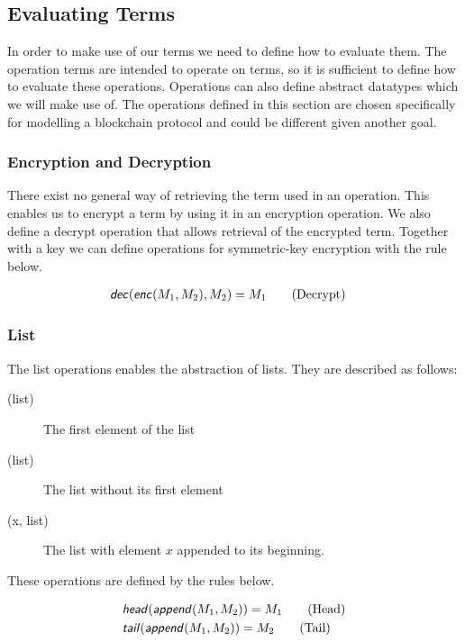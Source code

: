 \subsection{Evaluating Terms}
In order to make use of our terms we need to define how to evaluate them.
The operation terms are intended to operate on terms, so it is sufficient to define how to evaluate these operations.
Operations can also define abstract datatypes which we will make use of.
The operations defined in this section are chosen specifically for modelling a blockchain protocol and could be different given another goal.



\subsubsection{Encryption and Decryption}
There exist no general way of retrieving the term used in an operation.
This enables us to encrypt a term by using it in an encryption operation.
We also define a decrypt operation that allows retrieval of the encrypted term.
Together with a key we can define operations for symmetric-key encryption with the rule below.

\begin{align*}
    &\text{\sffamily \textit{dec}\normalfont}(\text{\sffamily \textit{enc}\normalfont}(M_1, M_2),M_2) = M_1 \tag{Decrypt}
\end{align*}

\FloatBarrier

\subsubsection{List}
The list operations enables the abstraction of lists.
They are described as follows:

\begin{description}
	\item[(list)] The first element of the list
	\item[(list)] The list without its first element
	\item[(x, list)] The list with element $x$ appended to its beginning.
\end{description}

These operations are defined by the rules below.

\begin{align*}
	&\text{\sffamily \textit{head}\normalfont}(\text{\sffamily \textit{append}\normalfont}(M_1, M_2)) = M_1 \tag{Head} \\
	&\text{\sffamily \textit{tail}\normalfont}(\text{\sffamily \textit{append}\normalfont}(M_1, M_2)) = M_2 \tag{Tail}
\end{align*}

